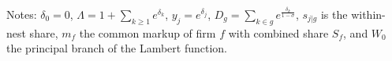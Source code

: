 \begin{table}[!tb]
\medskip
\begin{minipage}{\textwidth}
\footnotesize Notes: $\delta_0 = 0$, $\Lambda = 1 + \sum_{k \geq 1}e^{\delta_k}$, $y_j = e^{\delta_j}$, $D_g = \sum_{k \in g}e^{\frac{\delta_k}{1 - \sigma}}$,
$s_{j|g}$ is the within-nest share, $m_f$ the common markup of firm $f$ with combined share $S_f$, and $W_0$ the
principal branch of the Lambert function.
\end{minipage}
\end{table}
